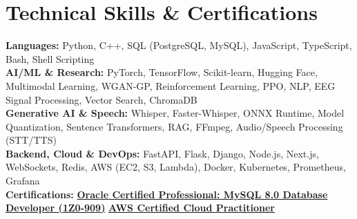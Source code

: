 \documentclass[letterpaper,10pt]{article}
\begin{document}
\section{Technical Skills \& Certifications}
 \begin{itemize}[leftmargin=0.0in, label={}]
    \small{\item{
     \textbf{Languages:} Python, C++, SQL (PostgreSQL, MySQL), JavaScript, TypeScript, Bash, Shell Scripting \\
     \textbf{AI/ML \& Research:} PyTorch, TensorFlow, Scikit-learn, Hugging Face, Multimodal Learning, WGAN-GP, Reinforcement Learning, PPO, NLP, EEG Signal Processing, Vector Search, ChromaDB \\
     \textbf{Generative AI \& Speech:} Whisper, Faster-Whisper, ONNX Runtime, Model Quantization, Sentence Transformers, RAG, FFmpeg, Audio/Speech Processing (STT/TTS) \\
     \textbf{Backend, Cloud \& DevOps:} FastAPI, Flask, Django, Node.js, Next.js, WebSockets, Redis, AWS (EC2, S3, Lambda), Docker, Kubernetes, Prometheus, Grafana \\
     \textbf{Certifications:} \href{https://www.credly.com/badges/3dc45737-a240-4ebd-865c-ac932ab9d71c/public_url}{\textbf{Oracle Certified Professional: MySQL 8.0 Database Developer (1Z0-909)}} \enspace\textbullet\enspace \href{https://www.credly.com/badges/3dc45737-a240-4ebd-865c-ac932ab9d71c/public_url}{\textbf{AWS Certified Cloud Practitioner}}
    }}
 \end{itemize}
\end{document}

